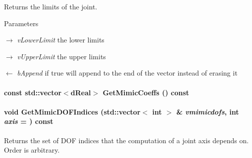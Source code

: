 Returns the limits of the joint. 


\begin{DoxyParams}{Parameters}
\item[\mbox{$\rightarrow$} {\em vLowerLimit}]the lower limits \item[\mbox{$\rightarrow$} {\em vUpperLimit}]the upper limits \item[\mbox{$\leftarrow$} {\em bAppend}]if true will append to the end of the vector instead of erasing it \end{DoxyParams}
\hypertarget{classOpenRAVE_1_1KinBody_1_1Joint_a23d3a787036ec4661af61c5c0f0a60b2}{
\paragraph[{GetMimicCoeffs}]{\setlength{\rightskip}{0pt plus 5cm}const std::vector$<$dReal$>$ GetMimicCoeffs () const}\hfill}
\label{classOpenRAVE_1_1KinBody_1_1Joint_a23d3a787036ec4661af61c5c0f0a60b2}
\hypertarget{classOpenRAVE_1_1KinBody_1_1Joint_acd2c27958f0bbd536ee752b237cbb514}{
\paragraph[{GetMimicDOFIndices}]{\setlength{\rightskip}{0pt plus 5cm}void GetMimicDOFIndices (std::vector$<$ int $>$ \& {\em vmimicdofs}, \/  int {\em axis} = {}) const}\hfill}
\label{classOpenRAVE_1_1KinBody_1_1Joint_acd2c27958f0bbd536ee752b237cbb514}


Returns the set of DOF indices that the computation of a joint axis depends on. Order is arbitrary. 

